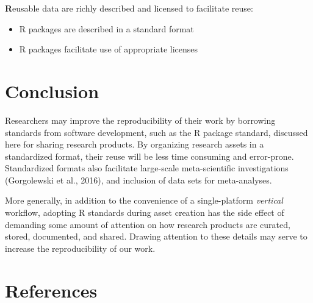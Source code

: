 \documentclass[
  english,
  jou,floatsintext]{apa6}
\providecommand{\tightlist}{%
  \setlength{\itemsep}{0pt}\setlength{\parskip}{0pt}}
\begin{document}
\textbf{R}eusable data are richly described and licensed to facilitate reuse:

\begin{itemize}
\tightlist
\item
  R packages are described in a standard format
\item
  R packages facilitate use of appropriate licenses
\end{itemize}

\hypertarget{conclusion}{%
\section{Conclusion}\label{conclusion}}

Researchers may improve the reproducibility of their work by borrowing standards from software development, such as the R package standard, discussed here for sharing research products. By organizing research assets in a standardized format, their reuse will be less time consuming and error-prone. Standardized formats also facilitate large-scale meta-scientific investigations (Gorgolewski et al., 2016), and inclusion of data sets for meta-analyses.

More generally, in addition to the convenience of a single-platform \emph{vertical} workflow, adopting R standards during asset creation has the side effect of demanding some amount of attention on how research products are curated, stored, documented, and shared. Drawing attention to these details may serve to increase the reproducibility of our work.

\hypertarget{references}{%
\section{References}\label{references}}

\begingroup
\end{document}
